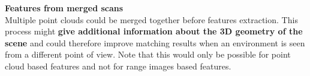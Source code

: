 \documentclass[a0paper,portrait]{baposter}
\begin{document}
\begin{poster}
{        \textbf{Features from merged scans}\\
        Multiple point clouds could be merged together before features extraction. This process might \textbf{give additional information about the 3D geometry of the scene} and could therefore improve matching results when an environment is seen from a different point of view. Note that this would only be possible for point cloud based features and not for range images based features.
    }

\end{poster}
\end{document}
